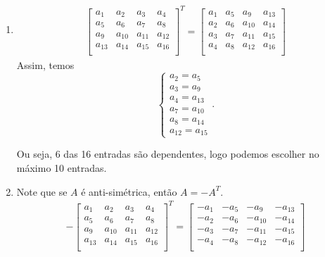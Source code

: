\documentclass[leqno]{article}
\begin{document}
\begin{enumerate}
    \begin{enumerate}
        \item \begin{align*}
        \begin{bmatrix}
            a_1 & a_2 & a_3 & a_4\\
            a_5 & a_6 & a_7 & a_8\\
            a_9 & a_{10} & a_{11} & a_{12}\\
            a_{13} & a_{14} & a_{15} & a_{16}\\
        \end{bmatrix}^T=\begin{bmatrix}
            a_1 & a_5 & a_9 & a_{13}\\
            a_2 & a_6 & a_{10} & a_{14}\\
            a_3 & a_7 & a_{11} & a_{15}\\
            a_4 & a_8 & a_{12} & a_{16}\\
        \end{bmatrix}
        \end{align*}
        Assim, temos $$\begin{cases}a_2=a_5\\a_3=a_9\\a_4=a_{13}\\a_7=a_{10}\\a_8=a_{14}\\a_{12}=a_{15}\end{cases}\text{.}$$
        
        Ou seja, 6 das 16 entradas são dependentes, logo podemos escolher no máximo 10 entradas.
        
        \item Note que se $A$ é anti-simétrica, então $A=-A^T$.
        \begin{align*}
            -\begin{bmatrix}
            a_1 & a_2 & a_3 & a_4\\
            a_5 & a_6 & a_7 & a_8\\
            a_9 & a_{10} & a_{11} & a_{12}\\
            a_{13} & a_{14} & a_{15} & a_{16}\\
        \end{bmatrix}^T=\begin{bmatrix}
            -a_1 & -a_5 & -a_9 & -a_{13}\\
            -a_2 & -a_6 & -a_{10} & -a_{14}\\
            -a_3 & -a_7 & -a_{11} & -a_{15}\\
            -a_4 & -a_8 & -a_{12} & -a_{16}\\
        \end{bmatrix}
        \end{align*}
        

\end{enumerate}
\end{enumerate}
\end{document}
